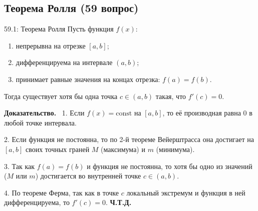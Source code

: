 \documentclass[a4paper,12pt]{article}
\newcommand{\myproof}{\textbf{Доказательство.}\ }
\begin{document}
	
	
	\vspace{1cm}
	\subsection{Теорема Ролля (59 вопрос)}
	
	\begin{theorembox}{59.1: Теорема Ролля}
		Пусть функция $f(x)$:
		\begin{enumerate}
			\item непрерывна на отрезке $[a, b]$;
			\item дифференцируема на интервале $(a, b)$;
			\item принимает равные значения на концах отрезка: $f(a) = f(b)$.
		\end{enumerate}
		Тогда существует хотя бы одна точка $c \in (a, b)$ такая, что $f'(c) = 0$.
	\end{theorembox}
	
	\myproof
	1. Если $f(x) = \text{const}$ на $[a, b]$, то её производная равна $0$ в любой точке интервала.
	
	2. Если функция не постоянна, то по 2-й теореме Вейерштрасса она достигает на $[a, b]$ своих точных граней $M$ (максимума) и $m$ (минимума).
	
	3. Так как $f(a) = f(b)$ и функция не постоянна, то хотя бы одно из значений ($M$ или $m$) достигается во внутренней точке $c \in (a, b)$.
	
	4. По теореме Ферма, так как в точке $c$ локальный экстремум и функция в ней дифференцируема, то $f'(c) = 0$. \textbf{Ч.Т.Д.}
	
	
	\begin{center}
	\end{center}
	
\end{document}
